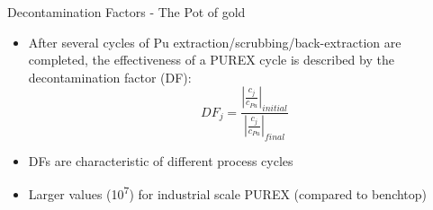 \documentclass{beamer}
\newcommand{\tss}{\textsuperscript}
\begin{document}





\begin{frame}{Decontamination Factors - The Pot of gold}
  \begin{itemize}
  \item{After several cycles of Pu extraction/scrubbing/back-extraction
    are completed, the effectiveness of a PUREX cycle is described
    by the decontamination factor (DF):}
    \begin{equation*}
      DF_j=\frac{\left|\frac{c_j}{c_{Pu}}\right|_{initial}}
      {\left|\frac{c_j}{c_{Pu}}\right|_{final}}
    \end{equation*}
  \item{DFs are characteristic of different process cycles}
  \item{Larger values (10\tss{7}) for industrial scale PUREX (compared
  to benchtop)\tss{\cite{stoller1961reactor,benedict1982nuclear}}}
  \end{itemize}
\end{frame}

\end{document}
